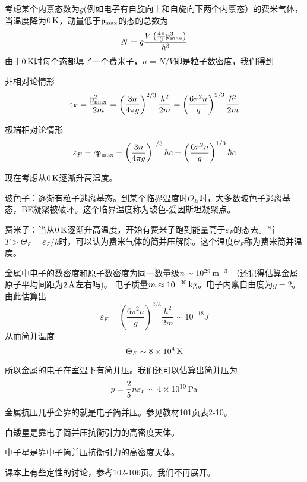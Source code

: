 \documentclass[CJK]{beamer}
\begin{document}
\begin{frame}
\bch
{\small
考虑某个内禀态数为$g$(例如电子有自旋向上和自旋向下两个内禀态）的费米气体，当温度降为$0\,\mathrm{K}$，动量低于${\mathfrak{p}}_{\max}$的态的总数为
$$ N =  g \frac{V \left(\frac{4\pi}{3} {\mathfrak{p}}_{\max}^3\right)}{h^3} $$
由于$0\,\mathrm{K}$时每个态都填了一个费米子，$n = N/V$即是粒子数密度，我们得到

非相对论情形
$$\varepsilon_F = \frac{{\mathfrak{p}}_{\max}^2}{2m} =  \left(\frac{3n}{4\pi g}\right)^{2/3} \frac{h^2}{2m} = \left(\frac{6\pi^2 n}{ g}\right)^{2/3} \frac{\hbar^2}{2m}$$

极端相对论情形
$$\varepsilon_F = c{\mathfrak{p}}_{\max} =  \left(\frac{3n}{4\pi g}\right)^{1/3} hc = \left(\frac{6\pi^2 n}{ g}\right)^{1/3} \hbar c$$
}
\ech
\end{frame}


\begin{frame}
\bch
现在考虑从$0\,\mathrm{K}$逐渐升高温度。
\bitem
\item{玻色子：逐渐有粒子逃离基态。到某个临界温度时$\Theta_B$时，大多数玻色子逃离基态，BE凝聚被破坏。这个临界温度称为{\blue 玻色-爱因斯坦凝聚点}。}
\item{费米子：当从$0\,\mathrm{K}$逐渐升高温度，开始有费米子跑到能量高于$\varepsilon_F$的态去。当$T> \Theta_F = \varepsilon_F/k$时，可以认为费米气体的简并压解除。这个温度$\Theta_F$称为{\blue 费米简并温度}。}
\eitem
\ech
\end{frame}

\begin{frame}
\bch
金属中电子的数密度和原子数密度为同一数量级$n\sim 10^{29} \,\mathrm{m}^{-3}$ （还记得估算金属原子平均间距为$2\,\text{\AA}$左右吗)。
电子质量$m\approx 10^{-30} \,\mathrm{kg}$。电子内禀自由度为$g = 2$。由此估算出
$$\varepsilon_F = \left(\frac{6\pi^2 n}{ g}\right)^{2/3} \frac{\hbar^2}{2m} \sim 10^{-18}J $$
从而简并温度
$$\Theta_F \sim 8\times 10^4 \,\mathrm{K}$$


所以金属的电子在室温下有简并压。我们还可以估算出简并压为
$$ p = \frac{2}{5} n \varepsilon_F \sim 4\times 10^{10}\,\mathrm{Pa}$$


金属抗压几乎全靠的就是电子简并压。参见教材101页表2-10。

\ech
\end{frame}


\begin{frame}
\bch
\bitem
\item{白矮星是靠电子简并压抗衡引力的高密度天体。}
\item{中子星是靠中子简并压抗衡引力的高密度天体。}
\eitem

课本上有些定性的讨论，参考102-106页。我们不再展开。

\ech
\end{frame}
\end{document}
